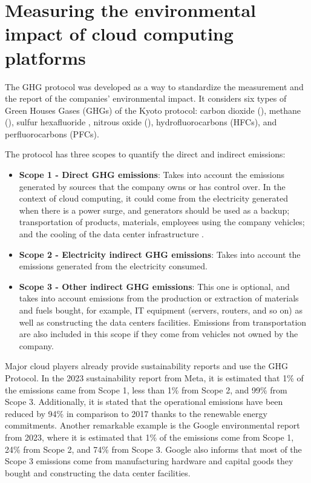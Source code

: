 \section{Measuring the environmental impact of cloud computing platforms}

\label{sec:measuring_environmental_impact}


The GHG protocol \cite{ghgprotocol2004} was developed as a way to standardize the measurement and the report of the companies' environmental impact. It considers six types of Green Houses Gases (GHGs) of the Kyoto protocol: carbon dioxide (), methane (), sulfur hexafluoride , nitrous oxide (), hydrofluorocarbons (HFCs), and perfluorocarbons (PFCs).


The protocol has three scopes to quantify the direct and indirect emissions:

\begin{itemize}
\item \textbf{Scope 1 - Direct GHG emissions}: Takes into account the emissions generated by sources that the company owns or has control over. In the context of cloud computing, it could come from the electricity generated when there is a power surge, and generators should be used as a backup; transportation of products, materials, employees using the company vehicles; and the cooling of the data center infrastructure \cite{gupta2021_chasingcarbon}.
\item \textbf{Scope 2 - Electricity indirect GHG emissions}: Takes into account the emissions generated from the electricity consumed.
\item \textbf{Scope 3 - Other indirect GHG emissions}: This one is optional, and takes into account emissions from the production or extraction of materials and fuels bought, for example, IT equipment (servers, routers, and so on) as well as constructing the data centers facilities. Emissions from transportation are also included in this scope if they come from vehicles not owned by the company.
\end{itemize}  

Major cloud players already provide sustainability reports and use the GHG Protocol. In the 2023 sustainability report from Meta\cite{meta_sustainability_report_2023}, it is estimated that 1\% of the emissions came from Scope 1, less than 1\% from Scope 2, and 99\% from Scope 3. Additionally, it is stated that the operational emissions have been reduced by 94\% in comparison to 2017 thanks to the renewable energy commitments. Another remarkable example is the Google environmental report from 2023\cite{google_sustainability_report_2023}, where it is estimated that 1\% of the emissions come from Scope 1, 24\% from Scope 2, and 74\% from Scope 3. Google also informs that most of the Scope 3 emissions come from manufacturing hardware and capital goods they bought and constructing the data center facilities.

